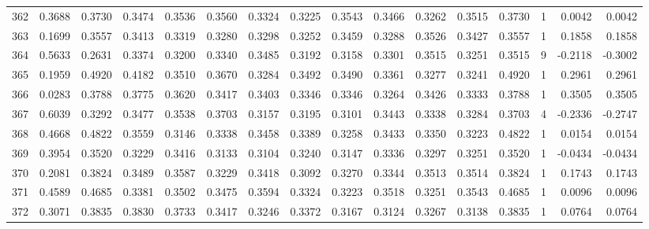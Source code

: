 \begin{tabular}{lrrrrrrrrrrrrrrr}
362 &      0.3688 &  0.3730 &  0.3474 &  0.3536 &  0.3560 &  0.3324 &  0.3225 &  0.3543 &  0.3466 &  0.3262 &   0.3515 &     0.3730 &      1 &                    0.0042 &                     0.0042 \\
363 &      0.1699 &  0.3557 &  0.3413 &  0.3319 &  0.3280 &  0.3298 &  0.3252 &  0.3459 &  0.3288 &  0.3526 &   0.3427 &     0.3557 &      1 &                    0.1858 &                     0.1858 \\
364 &      0.5633 &  0.2631 &  0.3374 &  0.3200 &  0.3340 &  0.3485 &  0.3192 &  0.3158 &  0.3301 &  0.3515 &   0.3251 &     0.3515 &      9 &                   -0.2118 &                    -0.3002 \\
365 &      0.1959 &  0.4920 &  0.4182 &  0.3510 &  0.3670 &  0.3284 &  0.3492 &  0.3490 &  0.3361 &  0.3277 &   0.3241 &     0.4920 &      1 &                    0.2961 &                     0.2961 \\
366 &      0.0283 &  0.3788 &  0.3775 &  0.3620 &  0.3417 &  0.3403 &  0.3346 &  0.3346 &  0.3264 &  0.3426 &   0.3333 &     0.3788 &      1 &                    0.3505 &                     0.3505 \\
367 &      0.6039 &  0.3292 &  0.3477 &  0.3538 &  0.3703 &  0.3157 &  0.3195 &  0.3101 &  0.3443 &  0.3338 &   0.3284 &     0.3703 &      4 &                   -0.2336 &                    -0.2747 \\
368 &      0.4668 &  0.4822 &  0.3559 &  0.3146 &  0.3338 &  0.3458 &  0.3389 &  0.3258 &  0.3433 &  0.3350 &   0.3223 &     0.4822 &      1 &                    0.0154 &                     0.0154 \\
369 &      0.3954 &  0.3520 &  0.3229 &  0.3416 &  0.3133 &  0.3104 &  0.3240 &  0.3147 &  0.3336 &  0.3297 &   0.3251 &     0.3520 &      1 &                   -0.0434 &                    -0.0434 \\
370 &      0.2081 &  0.3824 &  0.3489 &  0.3587 &  0.3229 &  0.3418 &  0.3092 &  0.3270 &  0.3344 &  0.3513 &   0.3514 &     0.3824 &      1 &                    0.1743 &                     0.1743 \\
371 &      0.4589 &  0.4685 &  0.3381 &  0.3502 &  0.3475 &  0.3594 &  0.3324 &  0.3223 &  0.3518 &  0.3251 &   0.3543 &     0.4685 &      1 &                    0.0096 &                     0.0096 \\
372 &      0.3071 &  0.3835 &  0.3830 &  0.3733 &  0.3417 &  0.3246 &  0.3372 &  0.3167 &  0.3124 &  0.3267 &   0.3138 &     0.3835 &      1 &                    0.0764 &                     0.0764 \\

\end{tabular}
